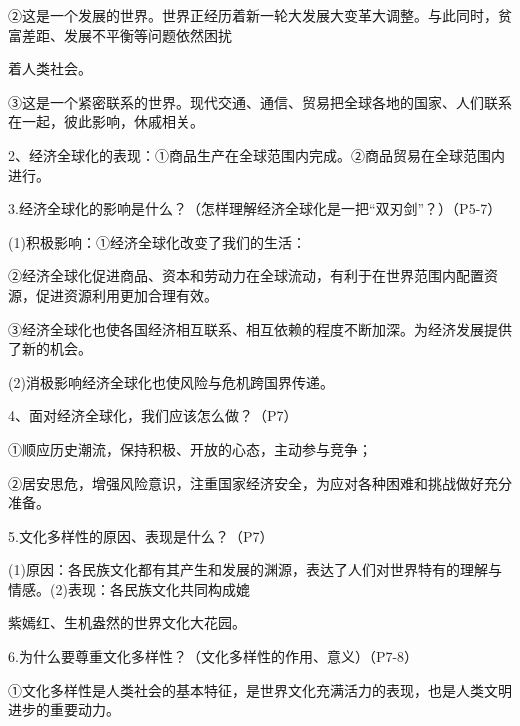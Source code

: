 \documentclass[lang=cn,11pt]{elegantbook}
\newcommand{\daofasym}[1]{{\daofasymbolfont #1}}
\newcommand{\daofasym}[1]{#1}
\begin{document}
\daofasym{②}这是一个发展的世界。世界正经历着新一轮大发展大变革大调整。与此同时，贫富差距、发展不平衡等问题依然困扰\par

着人类社会。\par

\daofasym{③}这是一个紧密联系的世界。现代交通、通信、贸易把全球各地的国家、人们联系在一起，彼此影响，休戚相关。\par

2、经济全球化的表现：\daofasym{①}商品生产在全球范围内完成。\daofasym{②}商品贸易在全球范围内进行。\par

3.经济全球化的影响是什么？（怎样理解经济全球化是一把“双刃剑”？）（P5-7）\par

(1)积极影响：\daofasym{①}经济全球化改变了我们的生活：\par

\daofasym{②}经济全球化促进商品、资本和劳动力在全球流动，有利于在世界范围内配置资源，促进资源利用更加合理有效。\par

\daofasym{③}经济全球化也使各国经济相互联系、相互依赖的程度不断加深。为经济发展提供了新的机会。\par

(2)消极影响经济全球化也使风险与危机跨国界传递。\par

4、面对经济全球化，我们应该怎么做？（P7）\par

\daofasym{①}顺应历史潮流，保持积极、开放的心态，主动参与竞争；\par

\daofasym{②}居安思危，增强风险意识，注重国家经济安全，为应对各种困难和挑战做好充分准备。\par

5.文化多样性的原因、表现是什么？（P7）\par

(1)原因：各民族文化都有其产生和发展的渊源，表达了人们对世界特有的理解与情感。(2)表现：各民族文化共同构成媲\par

紫嫣红、生机盎然的世界文化大花园。\par

6.为什么要尊重文化多样性？（文化多样性的作用、意义）（P7-8）\par

\daofasym{①}文化多样性是人类社会的基本特征，是世界文化充满活力的表现，也是人类文明进步的重要动力。\par
\end{document}
